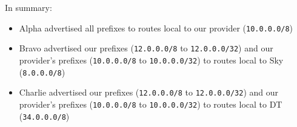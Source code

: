 In summary:

\begin{itemize}
    \item Alpha advertised all prefixes to routes local to our provider
    (\texttt{10.0.0.0/8})

    \item Bravo advertised our prefixes (\texttt{12.0.0.0/8} to \texttt
    {12.0.0.0/32}) and our provider's prefixes (\texttt{10.0.0.0/8} to
    \texttt{10.0.0.0/32}) to routes local to Sky (\texttt{8.0.0.0/8})

    \item Charlie advertised our prefixes (\texttt{12.0.0.0/8} to \texttt
    {12.0.0.0/32}) and our provider's prefixes (\texttt{10.0.0.0/8} to \texttt
    {10.0.0.0/32}) to routes local to DT (\texttt{34.0.0.0/8})
\end{itemize}
